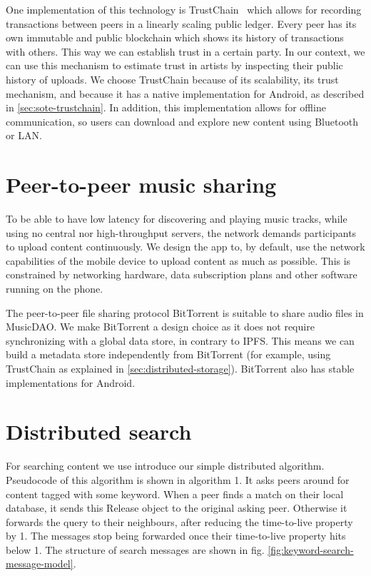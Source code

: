 One implementation of this technology is TrustChain~\citep{otte2017trustchain} which allows for recording transactions between peers in a linearly scaling public ledger. Every peer has its own immutable and public blockchain which shows its history of transactions with others. This way we can establish trust in a certain party. In our context, we can use this mechanism to estimate trust in artists by inspecting their public history of uploads. We choose TrustChain because of its scalability, its trust mechanism, and because it has a native implementation for Android, as described in \ref{sec:sote-trustchain}. In addition, this implementation allows for offline communication, so users can download and explore new content using Bluetooth or LAN.

\section{Peer-to-peer music sharing}
\label{sec:p2p-music-sharing}
To be able to have low latency for discovering and playing music tracks, while using no central nor high-throughput servers, the network demands participants to upload content continuously. We design the app to, by default, use the network capabilities of the mobile device to upload content as much as possible. This is constrained by networking hardware, data subscription plans and other software running on the phone.

The peer-to-peer file sharing protocol BitTorrent is suitable to share audio files in MusicDAO. We make BitTorrent a design choice as it does not require synchronizing with a global data store, in contrary to IPFS. This means we can build a metadata store independently from BitTorrent (for example, using TrustChain as explained in \ref{sec:distributed-storage}). BitTorrent also has stable implementations for Android.

\section{Distributed search}
For searching content we use introduce our simple distributed algorithm. Pseudocode of this algorithm is shown in algorithm 1. It asks peers around for content tagged with some keyword. When a peer finds a match on their local database, it sends this Release object to the original asking peer. Otherwise it forwards the query to their neighbours, after reducing the time-to-live property by 1. The messages stop being forwarded once their time-to-live property hits below 1. The structure of search messages are shown in fig. \ref{fig:keyword-search-message-model}.

